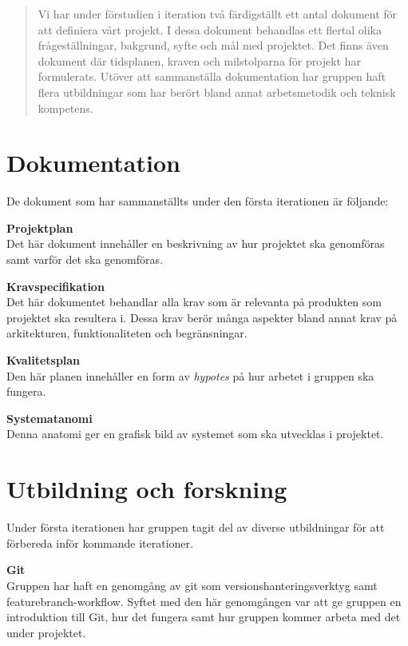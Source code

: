 \documentclass[a4paper,10pt]{article}
\begin{document}


\begin{abstract}
\noindent Vi har under förstudien i iteration två färdigställt ett antal dokument för att definiera vårt projekt. I dessa dokument behandlas ett flertal olika frågeställningar, bakgrund, syfte och mål med projektet. Det finns även dokument där tidsplanen, kraven och milstolparna för projekt har formulerats. Utöver att sammanställa dokumentation har gruppen haft flera utbildningar som har berört bland annat arbetsmetodik och teknisk kompetens.
\end{abstract}
\clearpage

\section{Dokumentation}
\label{sec:Dokumentation}
De dokument som har sammanställts under den första iterationen är följande:

\textbf{Projektplan}\\ Det här dokument innehåller en beskrivning av hur projektet ska genomföras samt varför det ska genomföras.

\textbf{Kravspecifikation}\\ Det här dokumentet behandlar alla krav som är relevanta på produkten som projektet ska resultera i. Dessa krav berör många aspekter bland annat krav på arkitekturen, funktionaliteten och begränsningar.

\textbf{Kvalitetsplan}\\ Den här planen innehåller en form av \emph{hypotes} på hur arbetet i gruppen ska fungera.

\textbf{Systematanomi}\\ Denna anatomi ger en grafisk bild av systemet som ska utvecklas i projektet.

\section{Utbildning och forskning}
\label{sec:Utbildning och forskning}
Under första iterationen har gruppen tagit del av diverse utbildningar för att förbereda inför kommande iterationer.

\textbf{Git}\\ Gruppen har haft en genomgång av git som versionshanteringsverktyg samt featurebranch-workflow. Syftet med den här genomgången var att ge gruppen en introduktion till Git, hur det fungera samt hur gruppen kommer arbeta med det under projektet.
\end{document}
